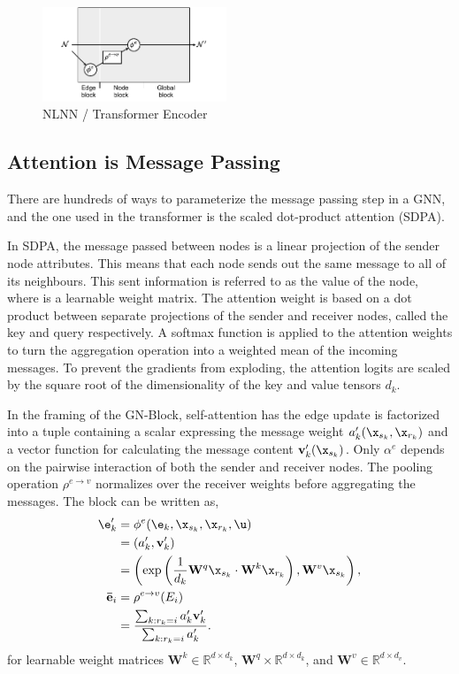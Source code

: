 \begin{figure}
    \centering
    \includegraphics[width=0.49\textwidth]{Figures/transformers/nonlocal.pdf}
    \caption{NLNN / Transformer Encoder}
    \label{fig:transformer}
\end{figure}

\subsection{Attention is Message Passing}
\label{sec:attention}

There are hundreds of ways to parameterize the message passing step in a GNN, and the one used in the transformer is the scaled dot-product attention (SDPA).

In SDPA, the message passed between nodes is a linear projection of the sender node attributes.
This means that each node sends out the same message to all of its neighbours.
This sent information is referred to as the value of the node, where is a learnable weight matrix.
The attention weight is based on a dot product between separate projections of the sender and receiver nodes, called the key and query respectively.
A softmax function is applied to the attention weights to turn the aggregation operation into a weighted mean of the incoming messages.
To prevent the gradients from exploding, the attention logits are scaled by the square root of the dimensionality of the key and value tensors $d_k$.

In the framing of the GN-Block, self-attention has the edge update is factorized into a tuple containing a scalar expressing the message weight $a_k'(\x_{s_k}, \x_{r_k})$ and a vector function for calculating the message content $\mathbf{v}_k'(\x_{s_k})$.
Only $\alpha^e$ depends on the pairwise interaction of both the sender and receiver nodes.
The pooling operation $\rho^{e \to v}$ normalizes over the receiver weights before aggregating the messages.
The block can be written as,
\begin{equation}
    \begin{aligned}
        \e_k' &= \phi^e(\e_k, \x_{s_k}, \x_{r_k}, \u) \\
        &= ( a_k', \mathbf{v}_k' ) \\
        &= \left( \exp \left( \frac{1}{d_k} \mathbf{W}^q \x_{s_k} \cdot \mathbf{W}^k \x_{r_k} \right), \mathbf{W}^v \x_{s_k} \right), \\
        \mathbf{\bar{e}}_i &= \rho^{e \to v}(E_i) \\
       &= \frac{\sum_{k: r_k = i} a_k' \mathbf{v}_k'}{\sum_{k: r_k = i} a_k'}.
    \end{aligned}
\end{equation}
for learnable weight matrices $\mathbf{W}^k \in \mathbb{R}^{d \times d_k}$, $\mathbf{W}^q \times \mathbb{R}^{d \times d_k}$, and $\mathbf{W}^v \in \mathbb{R}^{d \times d_v}$.

